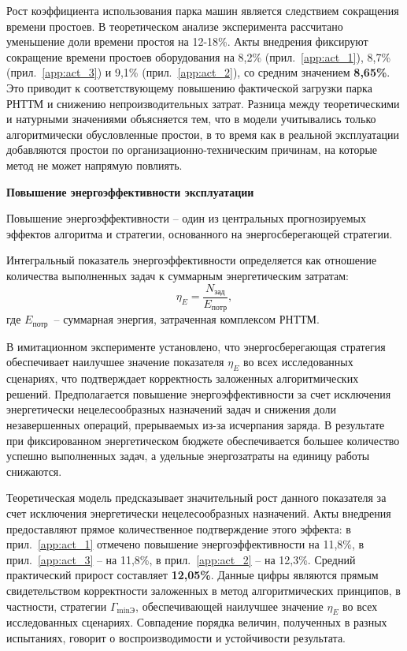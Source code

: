 Рост коэффициента использования парка машин является следствием сокращения времени простоев. В теоретическом анализе эксперимента рассчитано уменьшение доли времени простоя на 12-18\%. Акты внедрения фиксируют сокращение времени простоев оборудования на 8,2\% (прил.~\ref{app:act_1}), 8,7\% (прил.~\ref{app:act_3}) и 9,1\% (прил.~\ref{app:act_2}), со средним значением \textbf{8,65\%}. Это приводит к соответствующему повышению фактической загрузки парка РНТТМ и снижению непроизводительных затрат. Разница между теоретическими и натурными значениями объясняется тем, что в модели учитывались только алгоритмически обусловленные простои, в то время как в реальной эксплуатации добавляются простои по организационно-техническим причинам, на которые метод не может напрямую повлиять.

\textbf{Повышение энергоэффективности эксплуатации}

Повышение энергоэффективности -- один из центральных прогнозируемых эффектов алгоритма и стратегии, основанного на энергосберегающей стратегии.

Интегральный показатель энергоэффективности определяется как отношение количества выполненных задач к суммарным энергетическим затратам:
\begin{equation}
	\eta_E = \frac{N_{\text{зад}}}{E_{\text{потр}}},
\end{equation}
где $E_{\text{потр}}$~-- суммарная энергия, затраченная комплексом РНТТМ.

В имитационном эксперименте установлено, что энергосберегающая стратегия обеспечивает наилучшее значение показателя $\eta_E$ во всех исследованных сценариях, что подтверждает корректность заложенных алгоритмических решений. Предполагается повышение энергоэффективности за счет исключения энергетически нецелесообразных назначений задач и снижения доли незавершенных операций, прерываемых из-за исчерпания заряда. В результате при фиксированном энергетическом бюджете обеспечивается большее количество успешно выполненных задач, а удельные энергозатраты на единицу работы снижаются.

Теоретическая модель предсказывает значительный рост данного показателя за счет исключения энергетически нецелесообразных назначений. Акты внедрения предоставляют прямое количественное подтверждение этого эффекта: в прил.~\ref{app:act_1} отмечено повышение энергоэффективности на 11,8\%, в прил.~\ref{app:act_3} -- на 11,8\%, в прил.~\ref{app:act_2} -- на 12,3\%. Средний практический прирост составляет \textbf{12,05\%}. Данные цифры являются прямым свидетельством корректности заложенных в метод алгоритмических принципов, в частности, стратегии $ \Gamma_{\min\text{Э}} $, обеспечивающей наилучшее значение $ \eta_E $ во всех исследованных сценариях. Совпадение порядка величин, полученных в разных испытаниях, говорит о воспроизводимости и устойчивости результата.

